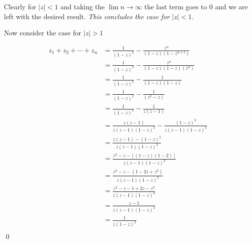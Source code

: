 \begin{enumerate}
	      Clearly for $|z| < 1$ and taking the $\lim n \to \infty$ the last term goes to $0$ and we are left
	      with the desired result. \textit{This concludes the case for $|z| < 1$.}

	      Now consider the case for $|z| > 1$

	      \begin{align*}
		      z_1 + z_2 + \cdots + z_n & = \frac{1}{(1 - z)^2} - \frac{z^n}{(1 - z)(1 - z^{n + 1})}                 \\
		                               & = \frac{1}{(1 - z)^2} - \frac{z^n}{(1 - z)(1 - z)(z^n)}                    \\
		                               & = \frac{1}{(1 - z)^2} - \frac{1}{(1 - z)(1 - z)}                           \\
		                               & = \frac{1}{(1 - z)^2} - \frac{1}{(z^2 - z)}                                \\
		                               & = \frac{1}{(1 - z)^2} - \frac{1}{z(z - 1)}                                 \\
		                               & = \frac{z(z - 1)}{z(z - 1)(1 - z)^2} - \frac{(1 - z)^2}{z(z - 1)(1 - z)^2} \\
		                               & = \frac{z(z - 1) - (1 - z)^2}{z(z - 1)(1 - z)^2}                           \\
		                               & = \frac{z^2 - z  - [(1 - z)(1 - 2)]}{z(z - 1)(1 - z)^2}                    \\
		                               & = \frac{z^2 - z  - (1 - 2z + z^2)}{z(z - 1)(1 - z)^2}                      \\
		                               & = \frac{z^2 - z  - 1 + 2z - z^2}{z(z - 1)(1 - z)^2}                        \\
		                               & = \frac{z - 1}{z(z - 1)(1 - z)^2}                                          \\
		                               & = \frac{1}{z(1 - z)^2}                                                     \\
	      \end{align*}
	      \qed

\end{enumerate}
\newpage